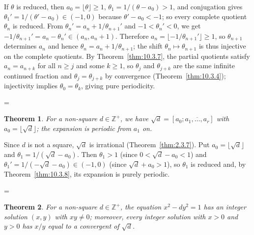 \documentclass[11pt]{article}
\makeatletter
\theoremstyle{ntstyle}
\newtheorem{theorem}{Theorem}[subsection]
\let\nt@closedisplay\]
\def\nt@guardedclose{\@ifnextchar\par{\nt@closeafterpar}{\@ifnextchar\end{\postdisplaypenalty\@M\nt@closedisplay}{\nt@closedisplay}}}
\def\nt@closeafterpar\par{\@ifnextchar\par{\nt@closeafterpar}{\@ifnextchar\end{\postdisplaypenalty\@M\nt@closedisplay\par}{\nt@closedisplay\par}}}
\renewenvironment{proof}[1][\proofname]{\par
  \pushQED{\qed}\normalfont\topsep\medskipamount\edef\nt@afterproof{\@endparpenalty=\the\@endparpenalty\relax}\@beginparpenalty\@M\@endparpenalty\@M\let\]\nt@guardedclose\trivlist\item[]\textit{#1\@addpunct{.}} \ignorespaces}{\ifvmode\addpenalty\@M\fi\popQED\nt@afterproof\endtrivlist\@endpefalse}
\makeatother
\begin{document}
\begin{proof} If $\theta$ is reduced, then
	$a_0=\lfloor\theta\rfloor\ge1$, $\theta_1=1/(\theta-a_0)>1$, and
	conjugation gives $\theta_1'=1/(\theta'-a_0)\in(-1,0)$ because
	$\theta'-a_0<-1$; so every complete quotient $\theta_n$ is reduced.
	From $\theta_n'=a_n+1/\theta_{n+1}'$ and $-1<\theta_n'<0$,
	we get $-1/\theta_{n+1}'=a_n-\theta_n'\in(a_n,a_n+1)$.
	Therefore $a_n=\lfloor-1/\theta_{n+1}'\rfloor\ge1$, so
	$\theta_{n+1}$ determines $a_n$ and hence
	$\theta_n=a_n+1/\theta_{n+1}$; the shift
	$\theta_n\mapsto\theta_{n+1}$ is thus injective on the complete
	quotients. By Theorem~\ref{thm:10.3.7}, the partial quotients satisfy
	$a_n=a_{n+k}$ for all $n\ge j$ and some $k\ge1$, so $\theta_j$ and
	$\theta_{j+k}$ are the same infinite continued fraction and
	$\theta_j=\theta_{j+k}$ by convergence (Theorem~\ref{thm:10.3.4});
	injectivity implies $\theta_0=\theta_k$, giving pure
	periodicity.

\end{proof}
\begin{theorem}\label{thm:10.3.9} For a
	non-square $d\in\mathbb{Z}^+$, we have $\sqrt
		{d}=[a_0;\overline{a_1,\ldots,a_r}]$ with $a_0=\lfloor\sqrt{d}\rfloor$;
	the expansion is periodic from $a_1$ on.

\end{theorem}

\begin{proof} Since $d$ is not a square, $\sqrt{d}$ is irrational
	(Theorem~\ref{thm:2.3.7}). Put $a_0=\lfloor\sqrt{d}\rfloor$ and
	$\theta_1=1/(\sqrt{d}-a_0)$. Then $\theta_1>1$ (since $0<\sqrt
		{d}-a_0<1$) and $\theta_1'=1/(-\sqrt{d}-a_0)\in(-1,0)$ (since $\sqrt
		{d}+a_0>1$), so $\theta_1$ is reduced and, by Theorem~\ref{thm:10.3.8}, its expansion is purely
	periodic.

\end{proof}
\begin{theorem}\label{thm:10.3.10}
	For a non-square $d\in\mathbb{Z}^+$, the equation $x^2-dy^2=1$ has an integer solution
	$(x,y)$ with $xy\neq0$; moreover, every integer solution with $x>0$ and $y>0$ has $x/y$ equal
	to a convergent of $\sqrt{d}$.

\end{theorem}
\end{document}
